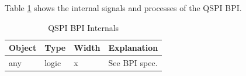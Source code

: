 
Table \ref{tab:asQspiPer07} shows the internal signals and processes of the QSPI BPI.
\begin{table}[H]
\caption{QSPI BPI Internals}
\label{tab:asQspiPer07}
\centering
\begin{tabularx}{\textwidth}{|l |l |l |X|}
  \hline
  Object & Type & Width & Explanation \\
  \hline
  \hline
  any & logic & x & See BPI spec. \\
  \hline
\end{tabularx}
\end{table}
